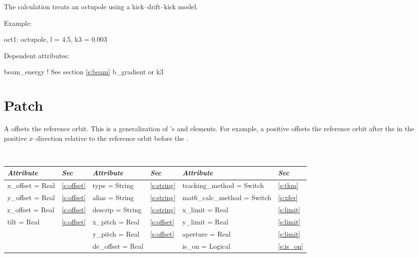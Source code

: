 The  calculation treats an octupole using a kick--drift--kick model.


\vskip0.05in \noindent
Example:
\begin{example}
  oct1: octupole, l = 4.5, k3 = 0.003
\end{example}

\vskip0.05in \noindent
Dependent attributes:
\begin{example}
  beam\_energy  ! See section \ref{s:beam}
  b\_gradient or k3
\end{example}

\section{Patch}
\label{s:patch}

A  offsets the reference orbit. This is a generalization of
\mad's  and  elements. For example, a positive
 offsets the reference orbit after the  in the
positive $x$--direction relative to the reference orbit before the
.

\toffset
\begin{center}
\tt
\begin{tabular}{|l|l||l|l||l|l|} \hline
  {\sl Attribute} & {\sl Sec}  & {\sl Attribute} & {\sl Sec} & {\sl Attribute} & {\sl Sec} \\ \hline
  x\_offset  = Real  & \ref{s:offset} &  type = String      & \ref{s:string} & tracking\_method = Switch   & \ref{s:tkm}   \\ \hline
  y\_offset  = Real  & \ref{s:offset} &  alias = String     & \ref{s:string} & mat6\_calc\_method = Switch & \ref{s:xfer}  \\ \hline
  z\_offset  = Real  & \ref{s:offset} &  descrip = String   & \ref{s:string} & x\_limit = Real             & \ref{s:limit} \\ \hline
  tilt = Real        & \ref{s:offset} &  x\_pitch   = Real  & \ref{s:offset} & y\_limit = Real             & \ref{s:limit} \\ \hline
                     &                &  y\_pitch   = Real  & \ref{s:offset} & aperture = Real             & \ref{s:limit} \\ \hline
                     &                &  de\_offset = Real  &                & is\_on = Logical            & \ref{s:is_on} \\ \hline
\end{tabular}
\end{center}
\toffset

